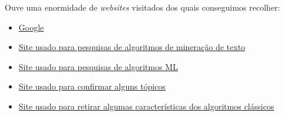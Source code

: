 \documentclass[a4paper,10pt]{article}
\begin{document}
Ouve uma enormidade de \textit{websites} visitados dos quais conseguimos recolher:
\begin{itemize}
    \item \href{https://www.google.com/}{Google}
    \item \href{https://www.devmedia.com.br/mineracao-de-texto-analise-comparativa-de-algoritmos-revista-sql-magazine-138/34013}{Site usado para pesquisas de algoritmos de mineração de texto}
    \item \href{https://azure.microsoft.com/pt-pt/overview/machine-learning-algorithms/#overview}{Site usado para pesquisas de algoritmos ML}
    \item \href{https://rockcontent.com/br/blog/web-crawler/}{Site usado para confirmar alguns tópicos}
    \item \href{https://www.geekboots.com/story/classic-algorithm-vs-ml-algorithm}{Site usado para retirar algumas características dos algoritmos clássicos}
\end{itemize}
\end{document}
